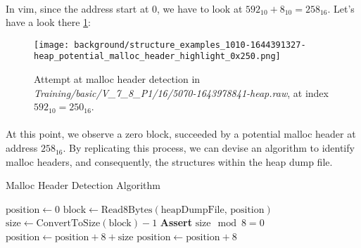             \paragraph{}In vim, since the address start at 0, we have to look at $ 592_{10} + 8_{10} = 258_{16} $. Let's have a look there \ref{fig:methods:malloc_header_detection_0x250}:
    
            \begin{figure}[H]
                \centering
                \texttt{[image: background/structure\_examples\_1010-1644391327-heap\_potential\_malloc\_header\_highlight\_0x250.png]}
                \caption{Attempt at malloc header detection in \textit{Training/basic/V\_7\_8\_P1/16/5070-1643978841-heap.raw}, at index $ 592_{10} = 250_{16} $.}
                \label{fig:methods:malloc_header_detection_0x250}
            \end{figure}
    
            \paragraph{}At this point, we observe a zero block, succeeded by a potential malloc header at address $ 258_{16} $. By replicating this process, we can devise an algorithm to identify malloc headers, and consequently, the structures within the heap dump file.
    
            \begin{algorithm}[H]
                \caption{Malloc Header Detection Algorithm}
                \begin{algorithmic}[1]
                    \State $\text{position} \gets 0$
                        \State $\text{block} \gets \text{Read8Bytes}(\text{heapDumpFile, position})$
                            \State $\text{size} \gets \text{ConvertToSize}(\text{block}) - 1$ 
                            \State \textbf{Assert} $ \text{size} \mod 8 = 0$ 
                            \State $\text{position} \gets \text{position} + 8 + \text{size}$ 
                        \Else
                            \State $\text{position} \gets \text{position} + 8$
                        \EndIf
                    \EndWhile
                \EndProcedure
                \end{algorithmic}
            \end{algorithm}
    
